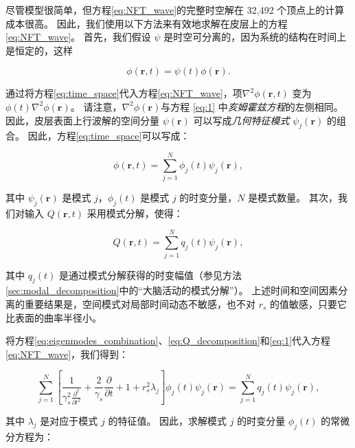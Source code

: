 \documentclass[lang=cn,a4paper,newtx,citestyle=gb7714-2015, bibstyle=gb7714-2015]{elegantpaper}
\begin{document}
尽管模型很简单，但方程\ref{eq:NFT_wave}的完整时空解在 32,492 个顶点上的计算成本很高。
因此，我们使用以下方法来有效地求解在皮层上的方程\ref{eq:NFT_wave}。
首先，我们假设 $ \psi $ 是时空可分离的，因为系统的结构在时间上是恒定的，这样

\begin{equation}\label{eq:time_space}
	\phi(\boldsymbol{r}, t) = 
		\psi(t) \phi(\boldsymbol{r}).
\end{equation}

通过将方程\ref{eq:time_space}代入方程\ref{eq:NFT_wave}，项$ \nabla^2 \phi(\boldsymbol{r}, t) $ 变为 $ \phi(t) \nabla^2 \phi
(\boldsymbol{r}) $。
请注意，$ \nabla^2 \phi(\boldsymbol{r}) $与方程 \ref{eq:1} 中\textit{亥姆霍兹方程}的左侧相同。
因此，皮层表面上行波解的空间分量 $ \psi(\boldsymbol{r}) $ 可以写成\textit{几何特征模式} $ \psi_j(\boldsymbol{r}) $ 的组合。
因此，方程\ref{eq:time_space}可以写成：

\begin{equation}\label{eq:eigenmodes_combination}
	\phi(\boldsymbol{r}, t) = 
		\sum_{j=1}^{N}
			\phi_j(t) \psi_j(\boldsymbol{r}),
\end{equation}

其中 $ \psi_j(\boldsymbol{r}) $ 是模式 $ j $，$ \phi_j(t) $ 是模式 $ j $ 的时变分量，$ N $ 是模式数量。
其次，我们对输入 $ Q(\boldsymbol{r},t) $ 采用模式分解，使得：

\begin{equation}\label{eq:Q_decomposition}
	Q(\boldsymbol{r}, t) = 
		\sum_{j=1}^{N}
			q_j(t) \psi_j(\boldsymbol{r}),
\end{equation}


其中 $ q_j (t) $ 是通过模式分解获得的时变幅值（参见方法\ref{sec:modal_decomposition}中的“大脑活动的模式分解”）。
上述时间和空间因素分离的重要结果是，空间模式对局部时间动态不敏感，也不对 $ r_s $ 的值敏感，只要它比表面的曲率半径小。


将方程\ref{eq:eigenmodes_combination}、\ref{eq:Q_decomposition}和\ref{eq:1}代入方程\ref{eq:NFT_wave}，我们得到：

\begin{equation}\label{eq:NFT_expand}
	\sum_{j=1}^{N}
		[
		\frac{1}{\gamma _s^2 \frac{\partial^2}{\partial t^2}} +
		\frac{2}{\gamma _s} \frac{\partial}{\partial t} +
		1 + r_s^2 \lambda_j
		]
		\phi_j(t)
		\psi_j(\boldsymbol{r})
	=
		\sum_{j=1}^{N}
			q_j(t)
			\psi_j(\boldsymbol{r}),
\end{equation}

其中 $ λ_j $ 是对应于模式 $ j $ 的特征值。
因此，求解模式 $ j $ 的时变分量 $ \phi_j (t) $ 的常微分方程为：
\end{document}
